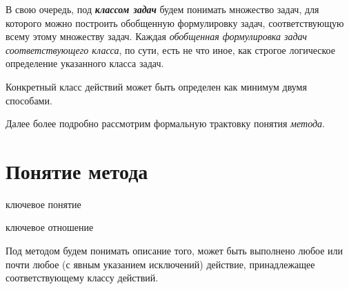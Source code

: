 В свою очередь, под \textbf{\textit{классом задач}} будем понимать множество задач, для которого можно построить обобщенную формулировку задач, соответствующую всему этому множеству задач. Каждая \textit{обобщенная формулировка задач соответствующего класса}, по сути, есть не что иное, как строгое логическое определение указанного класса задач.

\begin{SCn}
\end{SCn}

Конкретный класс действий может быть определен как минимум двумя способами.

\begin{SCn}

	\begin{scnsubdividing}
		\begin{scnindent}
		\end{scnindent}
	\end{scnsubdividing}
\end{SCn}

Далее более подробно рассмотрим формальную трактовку понятия \textit{метода}.

\section{Понятие метода}
\label{sec_method_concept}
\begin{SCn}
	\begin{scnrelfromlist}{ключевое понятие}
	\end{scnrelfromlist}

	\begin{scnrelfromlist}{ключевое отношение}
	\end{scnrelfromlist}
\end{SCn}

Под методом будем понимать описание того,  может быть выполнено любое или почти любое (с явным указанием исключений) действие, принадлежащее соответствующему классу действий.

